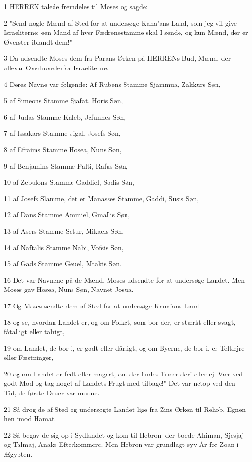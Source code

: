 \par 1 HERREN talede fremdeles til Moses og sagde:
\par 2 "Send nogle Mænd af Sted for at undersøge Kana'ans Land, som jeg vil give Israeliterne; een Mand af hver Fædrenestamme skal I sende, og kun Mænd, der er Øverster iblandt dem!"
\par 3 Da udsendte Moses dem fra Parans Ørken på HERRENs Bud, Mænd, der allevar Overhovederfor Israeliterne.
\par 4 Deres Navne var følgende: Af Rubens Stamme Sjammua, Zakkurs Søn,
\par 5 af Simeons Stamme Sjafat, Horis Søn,
\par 6 af Judas Stamme Kaleb, Jefunnes Søn,
\par 7 af Issakars Stamme Jigal, Josefs Søn,
\par 8 af Efraims Stamme Hosea, Nuns Søn,
\par 9 af Benjamins Stamme Palti, Rafus Søn,
\par 10 af Zebulons Stamme Gaddiel, Sodis Søn,
\par 11 af Josefs Slamme, det er Manasses Stamme, Gaddi, Susis Søn,
\par 12 af Dans Stamme Ammiel, Gmallis Søn,
\par 13 af Asers Stamme Setur, Mikaels Søn,
\par 14 af Naftalis Stamme Nabi, Vofsis Søn,
\par 15 af Gads Stamme Geuel, Mtakis Søn.
\par 16 Det var Navnene på de Mænd, Moses udsendte for at undersøge Landet. Men Moses gav Hosea, Nuns Søn, Navnet Josua.
\par 17 Og Moses sendte dem af Sted for at undersøge Kana'ans Land.
\par 18 og se, hvordan Landet er, og om Folket, som bor der, er stærkt eller svagt, fåtalligt eller talrigt,
\par 19 om Landet, de bor i, er godt eller dårligt, og om Byerne, de bor i, er Teltlejre eller Fæstninger,
\par 20 og om Landet er fedt eller magert, om der findes Træer deri eller ej. Vær ved godt Mod og tag noget af Landets Frugt med tilbage!" Det var netop ved den Tid, de første Druer var modne.
\par 21 Så drog de af Sted og undersøgte Landet lige fra Zins Ørken til Rehob, Egnen hen imod Hamat.
\par 22 Så begav de sig op i Sydlandet og kom til Hebron; der boede Ahiman, Sjesjaj og Talmaj, Anaks Efterkommere. Men Hebron var grundlagt syv År før Zoan i Ægypten.
